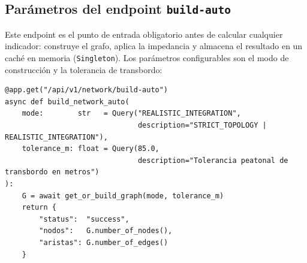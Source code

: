 \subsection*{Parámetros del endpoint \texttt{build-auto}}

Este endpoint es el punto de entrada obligatorio antes de calcular cualquier
indicador: construye el grafo, aplica la impedancia y almacena el resultado en
un caché en memoria (\texttt{Singleton}). Los parámetros configurables son el
modo de construcción y la tolerancia de transbordo:

\begin{lstlisting}[style=estiloPython,
    caption={Endpoint de construcción y calentamiento del caché del grafo.
             \texttt{src/api/main.py}.},
    label=lst:vft-build-auto]
@app.get("/api/v1/network/build-auto")
async def build_network_auto(
    mode:        str   = Query("REALISTIC_INTEGRATION",
                               description="STRICT_TOPOLOGY | REALISTIC_INTEGRATION"),
    tolerance_m: float = Query(85.0,
                               description="Tolerancia peatonal de transbordo en metros")
):
    G = await get_or_build_graph(mode, tolerance_m)
    return {
        "status":  "success",
        "nodos":   G.number_of_nodes(),
        "aristas": G.number_of_edges()
    }
\end{lstlisting}
